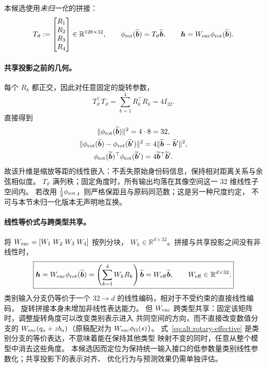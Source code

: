 \documentclass[11pt,UTF8,fontset=fandol]{ctexart}
\numberwithin{equation}{section}
\theoremstyle{definition}
\newcommand{\R}{\mathbb R}
\begin{document}
本候选使用\emph{未归一化}的拼接：
\begin{equation}
 T_{\vartheta}:=
 \begin{bmatrix}R_1\\R_2\\R_3\\R_4\end{bmatrix}\in\R^{128\times32},
 \qquad
 \phi_{\rm rot}(\widetilde{\bm b})=T_{\vartheta}\widetilde{\bm b},
 \qquad
 \bm h=W_{\rm enc}\phi_{\rm rot}(\widetilde{\bm b}).
 \label{eq:alt:rotary-lift}
\end{equation}

\paragraph{共享投影之前的几何。}
每个 $R_k$ 都正交，因此对任意固定的旋转参数，
\begin{equation}
 \boxed{T_{\vartheta}^{\top}T_{\vartheta}
 =\sum_{k=1}^{4}R_k^{\top}R_k=4I_{32}.}
 \label{eq:alt:rotary-isometry}
\end{equation}
直接得到
\begin{equation}
 \begin{gathered}
 \|\phi_{\rm rot}(\widetilde{\bm b})\|^2=4\cdot8=32,\\
 \|\phi_{\rm rot}(\widetilde{\bm b})-
       \phi_{\rm rot}(\widetilde{\bm b}')\|^2
   =4\|\widetilde{\bm b}-\widetilde{\bm b}'\|^2,\\
 \phi_{\rm rot}(\widetilde{\bm b})^\top
       \phi_{\rm rot}(\widetilde{\bm b}')
   =4\widetilde{\bm b}^{\top}\widetilde{\bm b}'.
 \end{gathered}
 \label{eq:alt:rotary-geometry}
\end{equation}
故该升维是缩放等距的线性嵌入：不丢失原始身份码信息，保持相对距离关系与余弦相似度。
$T_{\vartheta}$ 满列秩；固定角度时，所有输出均落在其像空间这一 32 维线性子空间内。
若改用 $\tfrac12\phi_{\rm rot}$，则严格保距且与原码同范数；这是另一种尺度约定，
不可与本节未归一化版本无声明地互换。

\paragraph{线性等价式与跨类型共享。}
将 $W_{\rm enc}=[W_1\;W_2\;W_3\;W_4]$ 按列分块，
$W_k\in\R^{d\times32}$。拼接与共享投影之间没有非线性时，
\begin{equation}
 \boxed{\bm h=W_{\rm enc}\phi_{\rm rot}(\widetilde{\bm b})
 =\left(\sum_{k=1}^{4}W_kR_k\right)\widetilde{\bm b}
 =W_{\rm eff}\widetilde{\bm b},\qquad W_{\rm eff}\in\R^{d\times32}.}
 \label{eq:alt:rotary-effective}
\end{equation}
类别输入分支仍等价于一个 $32\to d$ 的线性编码，相对于不受约束的直接线性编码，
旋转拼接本身未增加非线性表达能力。
但 $W_{\rm enc}$ 跨类型共享：固定该矩阵时，调整旋转角度可以改变类别表示进入
共同空间的方向，而不直接改变数值分支的 $W_{\rm enc}(q_a+zb_a)$（原稿配对为 $W_{\rm enc}\phi_\Omega(s)$）。
式~\eqref{eq:alt:rotary-effective} 是类别分支的等价表达，不意味着能在保持其他类型
映射不变的同时，任意从整个模型中消去这些角度。
本候选因而定位为保持统一输入接口的低参数量类别线性参数化；共享投影下的表示对齐、
优化行为与预测效果仍需单独评估。
\end{document}
